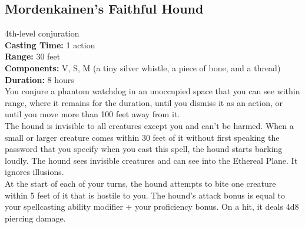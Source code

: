 \documentclass[11pt, A4paper, english]{article}
\begin{document}
		\subsection{Mordenkainen's Faithful Hound}
4th-level conjuration \\
\textbf{Casting Time:} 1 action \\
\textbf{Range:} 30 feet \\
\textbf{Components:} V, S, M (a tiny silver whistle, a piece of bone, and a thread) \\
\textbf{Duration:} 8 hours \\
You conjure a phantom watchdog in an unoccupied space that you can see within range, where it remains for the duration, until you dismiss it as an action, or until you move more than 100 feet away from it. \\
The hound is invisible to all creatures except you and can't be harmed. When a small or larger creature comes within 30 feet of it without first speaking the password that you specify when you cast this spell, the hound starts barking loudly. The hound sees invisible creatures and can see into the Ethereal Plane. It ignores illusions. \\
At the start of each of your turns, the hound attempts to bite one creature within 5 feet of it that is hostile to you. The hound’s attack bonus is equal to your spellcasting ability modifier + your proficiency bonus. On a hit, it deals 4d8 piercing damage.
\end{document}

